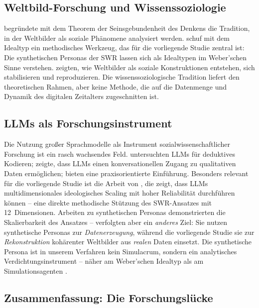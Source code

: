 \documentclass[12pt,a4paper]{article}
\begin{document}
\subsection{Weltbild-Forschung und Wissenssoziologie}
\label{sec:forschungsstand:wissenssoziologie}

\citet{Mannheim1929} begr\"undete mit dem Theorem der \glqq Seinsgebundenheit des Denkens\grqq{} die Tradition, in der Weltbilder als soziale Ph\"anomene analysiert werden. \citet{Weber1904} schuf mit dem Idealtyp ein methodisches Werkzeug, das f\"ur die vorliegende Studie zentral ist: Die synthetischen Personas der SWR lassen sich als Idealtypen im Weber'schen Sinne verstehen. \citet{BergerLuckmann1966} zeigten, wie Weltbilder als soziale Konstruktionen entstehen, sich stabilisieren und reproduzieren. Die wissenssoziologische Tradition liefert den theoretischen Rahmen, aber keine Methode, die auf die Datenmenge und Dynamik des digitalen Zeitalters zugeschnitten ist.


\subsection{LLMs als Forschungsinstrument}
\label{sec:forschungsstand:llm}

Die Nutzung gro\ss{}er Sprachmodelle als Instrument sozialwissenschaftlicher Forschung ist ein rasch wachsendes Feld. \citet{Tai2024} untersuchten LLMs f\"ur deduktives Kodieren; \citet{Hayes2025} zeigte, dass LLMs einen konversationellen Zugang zu qualitativen Daten erm\"oglichen; \citet{NicmanisSpurrier2025} bieten eine praxisorientierte Einf\"uhrung. Besonders relevant f\"ur die vorliegende Studie ist die Arbeit von \citet{OrnsteinEtAl2025}, die zeigt, dass LLMs multidimensionales ideologisches Scaling mit hoher Reliabilit\"at durchf\"uhren k\"onnen -- eine direkte methodische St\"utzung des SWR-Ansatzes mit 12~Dimensionen. Arbeiten zu synthetischen Personas \citep{Ge2024} demonstrierten die Skalierbarkeit des Ansatzes -- verfolgten aber ein \emph{anderes} Ziel: Sie nutzen synthetische Personas zur \emph{Datenerzeugung}, w\"ahrend die vorliegende Studie sie zur \emph{Rekonstruktion} koh\"arenter Weltbilder aus \emph{realen} Daten einsetzt. Die synthetische Persona ist in unserem Verfahren kein Simulacrum, sondern ein analytisches Verdichtungsinstrument -- n\"aher am Weber'schen Idealtyp als am Simulationsagenten \citep[vgl.][]{Booth1961, NgRussell2000, JaraEttinger2019}.


\subsection{Zusammenfassung: Die Forschungsl\"ucke}
\label{sec:forschungsstand:luecke}
\end{document}

